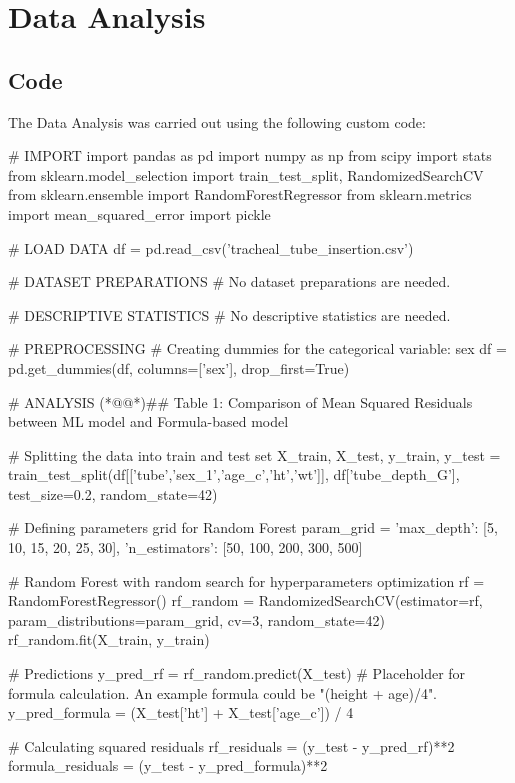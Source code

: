 \documentclass[11pt]{article}
\begin{document}
\section{Data Analysis}
\subsection{{Code}}
The Data Analysis was carried out using the following custom code:

\begin{python}

# IMPORT
import pandas as pd
import numpy as np
from scipy import stats
from sklearn.model_selection import train_test_split, RandomizedSearchCV
from sklearn.ensemble import RandomForestRegressor
from sklearn.metrics import mean_squared_error
import pickle

# LOAD DATA
df = pd.read_csv('tracheal_tube_insertion.csv')

# DATASET PREPARATIONS
# No dataset preparations are needed.

# DESCRIPTIVE STATISTICS
# No descriptive statistics are needed.

# PREPROCESSING
# Creating dummies for the categorical variable: sex
df = pd.get_dummies(df, columns=['sex'], drop_first=True)

# ANALYSIS
(*@@*)## Table 1: Comparison of Mean Squared Residuals between ML model and Formula-based model

# Splitting the data into train and test set
X_train, X_test, y_train, y_test = train_test_split(df[['tube','sex_1','age_c','ht','wt']], df['tube_depth_G'], test_size=0.2, random_state=42)

# Defining parameters grid for Random Forest
param_grid = {
    'max_depth': [5, 10, 15, 20, 25, 30],
    'n_estimators': [50, 100, 200, 300, 500]
}

# Random Forest with random search for hyperparameters optimization
rf = RandomForestRegressor()
rf_random = RandomizedSearchCV(estimator=rf, param_distributions=param_grid, cv=3, random_state=42)
rf_random.fit(X_train, y_train)

# Predictions
y_pred_rf = rf_random.predict(X_test)
# Placeholder for formula calculation. An example formula could be "(height + age)/4".
y_pred_formula = (X_test['ht'] + X_test['age_c']) / 4  

# Calculating squared residuals
rf_residuals = (y_test - y_pred_rf)**2
formula_residuals = (y_test - y_pred_formula)**2


\end{python}
\end{document}
